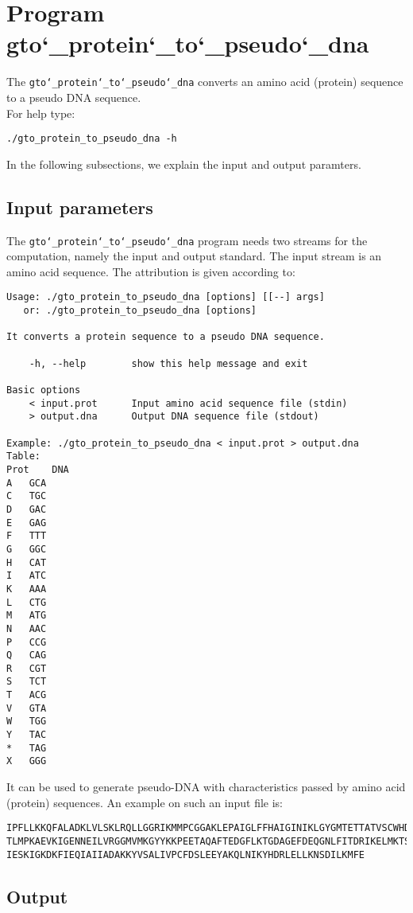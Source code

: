 \section{Program gto\char`_protein\char`_to\char`_pseudo\char`_dna}

The \texttt{gto\char`_protein\char`_to\char`_pseudo\char`_dna} converts an amino acid (protein) sequence to a pseudo DNA sequence.\\
For help type:
\begin{lstlisting}
./gto_protein_to_pseudo_dna -h
\end{lstlisting}
In the following subsections, we explain the input and output paramters.

\subsection*{Input parameters}

The \texttt{gto\char`_protein\char`_to\char`_pseudo\char`_dna} program needs two streams for the computation,
namely the input and output standard. The input stream is an amino acid sequence.
The attribution is given according to:
\begin{lstlisting}
Usage: ./gto_protein_to_pseudo_dna [options] [[--] args]
   or: ./gto_protein_to_pseudo_dna [options]

It converts a protein sequence to a pseudo DNA sequence.

    -h, --help        show this help message and exit

Basic options
    < input.prot      Input amino acid sequence file (stdin)
    > output.dna      Output DNA sequence file (stdout)

Example: ./gto_protein_to_pseudo_dna < input.prot > output.dna
Table:
Prot	DNA
A	GCA
C	TGC
D	GAC
E	GAG
F	TTT
G	GGC
H	CAT
I	ATC
K	AAA
L	CTG
M	ATG
N	AAC
P	CCG
Q	CAG
R	CGT
S	TCT
T	ACG
V	GTA
W	TGG
Y	TAC
*	TAG
X	GGG
\end{lstlisting}
It can be used to generate pseudo-DNA with characteristics passed by amino acid (protein) sequences. An example on such an input file is:
\begin{lstlisting}
IPFLLKKQFALADKLVLSKLRQLLGGRIKMMPCGGAKLEPAIGLFFHAIGINIKLGYGMTETTATVSCWHDFQFNPNSIG
TLMPKAEVKIGENNEILVRGGMVMKGYYKKPEETAQAFTEDGFLKTGDAGEFDEQGNLFITDRIKELMKTSNGKYIAPQY
IESKIGKDKFIEQIAIIADAKKYVSALIVPCFDSLEEYAKQLNIKYHDRLELLKNSDILKMFE
\end{lstlisting}

\subsection*{Output}

